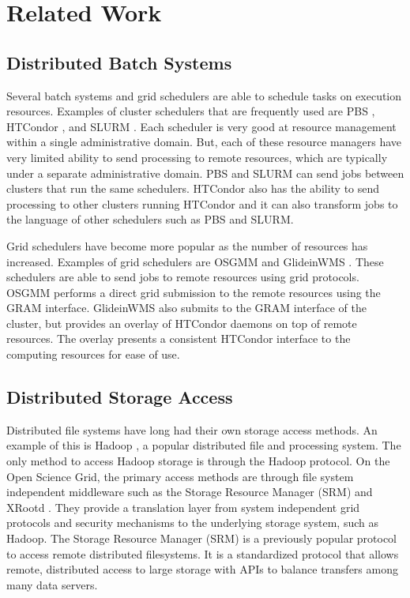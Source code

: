 \chapter{Related Work}
\label{chapter:relatedwork}

\section{Distributed Batch Systems}


Several batch systems and grid schedulers are able to schedule tasks on execution resources.  Examples of cluster schedulers that are frequently used are PBS \cite{pbstorque}, \mbox{HTCondor} \cite{litzkow1988condor}, and SLURM \cite{yoo2003slurm}.  Each scheduler is very good at resource management within a single administrative domain.  But, each of these resource managers have very limited ability to send processing to remote resources, which are typically under a separate administrative domain.  PBS and SLURM can send jobs between clusters that run the same schedulers.  HTCondor also has the ability to send processing to other clusters running HTCondor and it can also transform jobs to the language of other schedulers such as PBS and SLURM.

Grid schedulers have become more popular as the number of resources has increased.  Examples of grid schedulers are OSGMM \cite{website:osgmm} and GlideinWMS \cite{sfiligoi2008glideinwms}.  These schedulers are able to send jobs to remote resources using grid protocols.  OSGMM performs a direct grid submission to the remote resources using the GRAM  \cite{foster1999globus} interface.  GlideinWMS also submits to the GRAM interface of the cluster, but provides an overlay of HTCondor daemons on top of remote resources.  The overlay presents a consistent HTCondor interface to the computing resources for ease of use.  


\section{Distributed Storage Access}

Distributed file systems have long had their own storage access methods.  An example of this is Hadoop \cite{white2012hadoop}, a popular distributed file and processing system.  The only method to access Hadoop storage is through the Hadoop protocol.  On the Open Science Grid, the primary access methods are through file system independent middleware such as the Storage Resource Manager (SRM) \cite{shoshani2002storage} and XRootd \cite{dorigo2005xrootd}.  They provide a translation layer from system independent grid protocols and security mechanisms to the underlying storage system, such as Hadoop.  The Storage Resource Manager (SRM) is a previously popular protocol to access remote distributed filesystems.  It is a standardized protocol that allows remote, distributed access to large storage with APIs to balance transfers among many data servers.


